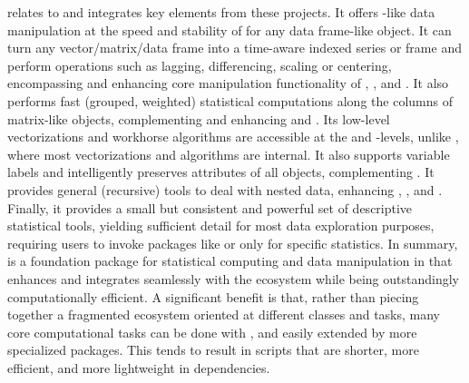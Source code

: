 \documentclass[nojss]{jss} %
\begin{document}
 relates to and integrates key elements from these projects. It offers -like data manipulation at the speed and stability of  for any data frame-like object. It can turn any vector/matrix/data frame into a time-aware indexed series or frame and perform operations such as lagging, differencing, scaling or centering, encompassing and enhancing core manipulation functionality of , , and . It also performs fast (grouped, weighted) statistical computations along the columns of matrix-like objects, complementing and enhancing  and . Its low-level vectorizations and workhorse algorithms are accessible at the  and -levels, unlike , where most vectorizations and algorithms are internal. It also supports variable labels and intelligently preserves attributes of all objects, complementing . It provides general (recursive) tools to deal with nested data, enhancing , , and . Finally, it provides a small but consistent and powerful set of descriptive statistical tools, yielding sufficient detail for most data exploration purposes, requiring users to invoke packages like  or  only for specific statistics. In summary,  is a foundation package for statistical computing and data manipulation in  that enhances and integrates seamlessly with the  ecosystem while being outstandingly computationally efficient. A significant benefit is that, rather than piecing together a fragmented ecosystem oriented at different classes and tasks, many core computational tasks can be done with , and easily extended by more specialized packages. This tends to result in  scripts that are shorter, more efficient, and more lightweight in dependencies. \newline
\end{document}
